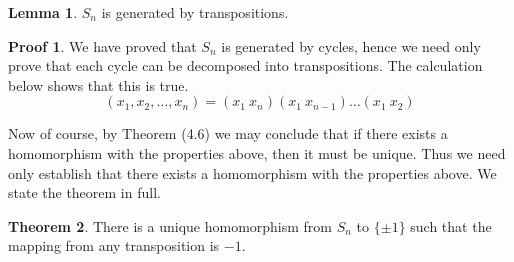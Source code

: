 \documentclass[12pt]{amsbook}
\theoremstyle{definition}
\newtheorem{theorem}{Theorem}[chapter]
\newtheorem{lemma}[theorem]{Lemma}
\newtheorem*{prf}{Proof}
\begin{document}
\begin{lemma}
    $S_n$ is generated by transpositions.
\end{lemma}
\begin{prf}
    We have proved that $S_n$ is generated by cycles, hence we need only prove that each cycle can be decomposed into transpositions. The calculation below shows that this is true.
    \[ (x_1, x_2, \dots, x_n) = (x_1\ x_n) (x_1\ x_{n-1}) \dots (x_1\ x_2) \]
\end{prf}

Now of course, by Theorem (4.6) we may conclude that if there exists a homomorphism with the properties above, then it must be unique. Thus we need only establish that there exists a homomorphism with the properties above. We state the theorem in full.

\begin{theorem}
    There is a unique homomorphism from $S_n$ to $\{ \pm 1 \}$ such that the mapping from any transposition is $-1$.
\end{theorem}
\end{document}
